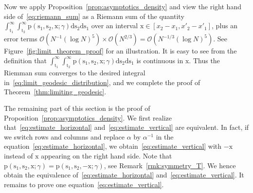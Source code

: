\documentclass{article}
\numberwithin{equation}{section}
\newcommand{\bigO}{\mathcal{O}}
\newcommand{\limp}{\mathrm{p}}
\begin{document}
Now we apply Proposition~\ref{prop:asymptotics_density} and view the right hand side of~\eqref{eq:riemann_sum} as a Riemann sum of the quantity $\int_{\mathrm{t}_1}^\infty \int_{\mathrm{t}_2}^\infty\limp(\mathrm{s}_1,\mathrm{s}_2,\mathrm{x};\gamma)\mathrm{d}{\mathrm{s}_2}\mathrm{d}{\mathrm{s}_1}$ over an interval $\mathrm{x}\in [x_2-x_1,x'_2-x'_1]$, plus an error terms $\bigO(N^{-1}(\log N)^5)\times \bigO(N^{2/3})=\bigO(N^{-1/3}(\log N)^5)$. See Figure~\ref{fig:limit_theorem_proof} for an illustration. It is easy to see from the definition that $\int_{\mathrm{t}_1}^\infty \int_{\mathrm{t}_2}^\infty\limp(\mathrm{s}_1,\mathrm{s}_2,\mathrm{x};\gamma)\mathrm{d}{\mathrm{s}_2}\mathrm{d}{\mathrm{s}_1}$ is continuous in $\mathrm{x}$. Thus the Riemman sum converges to the desired integral in~\eqref{eq:limit_geodesic_distribution}, and we complete the proof of Theorem~\ref{thm:limiting_geodesic}.



\bigskip

The remaining part of this section is the proof of Proposition~\ref{prop:asymptotics_density}. We first realize that~\eqref{eq:estimate_horizontal} and~\eqref{eq:estimate_vertical} are equivalent. In fact, if we switch rows and columns and replace $\alpha$ by $\alpha^{-1}$ in the equation~\eqref{eq:estimate_horizontal}, we obtain~\eqref{eq:estimate_vertical} with $-\mathrm{x}$ instead of $\mathrm{x}$ appearing on the right hand side. Note that $\limp(\mathrm{s}_1,\mathrm{s}_2,\mathrm{x};\gamma)=\limp(\mathrm{s}_1,\mathrm{s}_2,-\mathrm{x};\gamma)$, see Remark~\ref{rmk:symmetry_T}. We hence obtain the equivalence of~\eqref{eq:estimate_horizontal} and~\eqref{eq:estimate_vertical}. It remains to prove one equation~\eqref{eq:estimate_vertical}.
\end{document}
